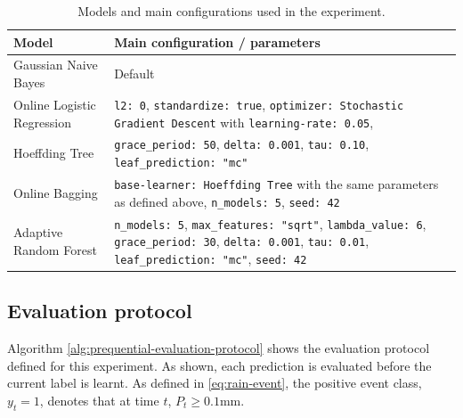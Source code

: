 \documentclass[11pt,a4paper]{article}
\newif\ifdraftinstructions
\newcommand{\instruction}[1]{%
	\ifdraftinstructions
	\begin{instructionbox}[title=What to write here]
		\small\color{SecondaryText}#1
	\end{instructionbox}
	\fi
}
\begin{document}
	\begin{table}[H]
		\centering
		\frenchspacing
		\caption{Models and main configurations used in the experiment.}
		\label{tab:model-config}
		\begin{tabularx}{0.96\textwidth}{@{}L{4.7cm}Y@{}}
			\toprule
			\textbf{Model} & \textbf{Main configuration / parameters} \\
			\midrule
			Gaussian Naive Bayes & Default \\
			Online Logistic Regression & \texttt{l2: 0}, \texttt{standardize: true}, \texttt{optimizer: Stochastic Gradient Descent} with \texttt{learning-rate: 0.05},  \\
			Hoeffding Tree & \texttt{grace\_period: 50}, \texttt{delta: 0.001}, \texttt{tau: 0.10}, \texttt{leaf\_prediction: "mc"} \\
			Online Bagging & \texttt{base-learner: Hoeffding Tree} with the same parameters as defined above, \texttt{n\_models: 5}, \texttt{seed: 42} \\
			Adaptive Random Forest & \texttt{n\_models: 5}, \texttt{max\_features: "sqrt"}, \texttt{lambda\_value: 6}, \texttt{grace\_period: 30}, \texttt{delta: 0.001}, \texttt{tau: 0.01}, \texttt{leaf\_prediction: "mc"}, \texttt{seed: 42} \\
			\bottomrule
		\end{tabularx}
	\end{table}
	
	\subsection{Evaluation protocol}	
	\instruction{State explicitly that each prediction was evaluated before the current label was learned. Report Accuracy, Macro-F1, Precision, Recall and the confusion matrix, together with prediction and update cost per event. Explain which class is treated as the positive event class.}
	
	Algorithm \autoref{alg:prequential-evaluation-protocol} shows the evaluation protocol defined for this experiment. As shown, each prediction is evaluated before the current label is learnt. As defined in \autoref{eq:rain-event}, the positive event class, $y_t = 1$, denotes that at time $t$, $P_t \ge 0.1\mathrm{mm}$.
	
\end{document}
